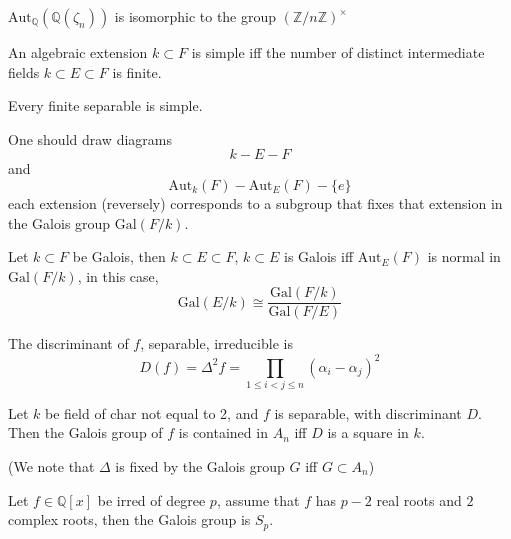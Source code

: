 \documentclass[openany]{book}
\newcommand{\Z}{\mathbb{Z}}
\newcommand{\Q}{\mathbb{Q}}
\newcommand{\gal}{\text{Gal}}
\begin{document}
\begin{prop}
    $\text{Aut}_\Q(\Q(\zeta_n))$ is isomorphic to the group $(\Z/n\Z)^\times$
\end{prop}



\begin{prop}
    An algebraic extension $k\subset F$ is simple iff the number of distinct intermediate fields $k\subset E\subset F$ is finite.
\end{prop}

\begin{thm}
    Every finite separable is simple.
\end{thm}

One should draw diagrams 
\begin{equation*}
    k-E-F
\end{equation*}
and 
\begin{equation*}
    \text{Aut}_k(F)-\text{Aut}_E(F)-\{e\}
\end{equation*}
each extension (reversely) corresponds to a subgroup that fixes that extension in the Galois group $\gal(F/k)$.

\begin{thm}
    Let $k\subset F$ be Galois, then $k\subset E\subset F$, $k\subset E$ is Galois iff $\text{Aut}_E(F)$ is normal in $\gal(F/k)$, in this case, 
    \begin{equation*}
        \gal(E/k)\cong\frac{\gal(F/k)}{\gal(F/E)}
    \end{equation*}
\end{thm}


\begin{defn}[discriminant]
    The discriminant of $f$, separable, irreducible is 
    \begin{equation*}
        D(f)=\Delta^2f=\prod_{1\leq i<j\leq n}(\alpha_i-\alpha_j)^2
    \end{equation*}
\end{defn}

\begin{prop}
    Let $k$ be field of char not equal to 2, and $f$ is separable, with discriminant $D$. Then the Galois group of $f$ is contained in $A_n$ iff $D$ is a square in $k$.

    (We note that $\Delta$ is fixed by the Galois group $G$ iff $G\subset A_n$)
\end{prop}

\begin{prop}
    Let $f\in\Q[x]$ be irred of degree $p$, assume that $f$ has $p-2$ real roots and $2$ complex roots, then the Galois group is $S_p$.
\end{prop}
\end{document}
